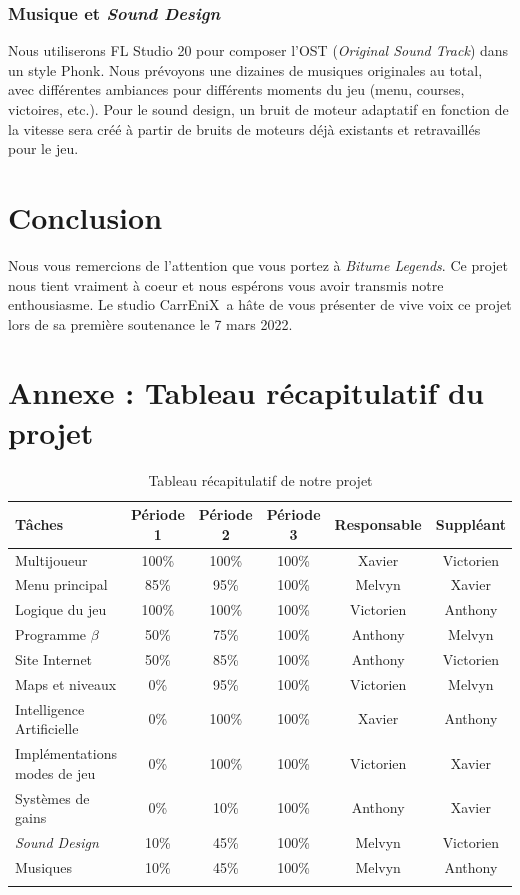 \documentclass[12pt,a4paper]{article}
\newcommand{\btmlgs}{\textit{Bitume Legends}}
\newcommand{\AI}{Intelligence Artificielle}
\newcommand{\CEX}{CarrEniX}
\begin{document}
\subsubsection{Musique et \textit{Sound Design}}
Nous utiliserons FL Studio 20 pour composer l'OST (\textit{Original Sound Track}) dans un style Phonk.
Nous prévoyons une dizaines de musiques originales au total, avec différentes ambiances pour
différents moments du jeu (menu, courses, victoires, etc.). Pour le sound design, un bruit de 
moteur adaptatif en fonction de la vitesse sera créé à partir de bruits de moteurs déjà 
existants et retravaillés pour le jeu.
\clearpage

\section{Conclusion}
Nous vous remercions de l'attention que vous portez à \btmlgs.
Ce projet nous tient vraiment à coeur et nous espérons vous avoir transmis notre enthousiasme.
Le studio \CEX\, a hâte de vous présenter de vive voix ce projet lors de sa première soutenance le 7 mars 2022.


\section{Annexe : Tableau récapitulatif du projet}
\renewcommand{\arraystretch}{1.2}
\setlength{\LTleft}{-1cm plus 1 fill}
\setlength{\LTright}{-1cm plus 1 fill}
\begin{longtable}{| p{4.5cm} || c | c | c | c | c |}
    \hline
    Tâches & Période 1 & Période 2 & Période 3 & Responsable & Suppléant\\\hline\hline
    Multijoueur & 100\% & 100\% & 100\% & Xavier & Victorien \\\hline
    Menu principal & 85\% & 95\% & 100\% & Melvyn & Xavier \\\hline
    Logique du jeu & 100\% & 100\%  & 100\% & Victorien & Anthony\\\hline
    Programme \(\beta\) & 50\% & 75\% & 100\% & Anthony & Melvyn \\\hline
    Site Internet & 50\% & 85\%  & 100\% & Anthony & Victorien\\\hline
    Maps et niveaux & 0\% & 95\%  & 100\% & Victorien & Melvyn\\\hline
    \AI & 0\% & 100\%  & 100\% & Xavier & Anthony\\\hline
    Implémentations modes de jeu & 0\% & 100\%  & 100\% & Victorien & Xavier\\\hline
    Systèmes de gains & 0\% & 10\%  & 100\% & Anthony & Xavier\\\hline
    \textit{Sound Design} & 10\% & 45\% & 100\% & Melvyn & Victorien\\\hline
    Musiques & 10\% & 45\%  & 100\% & Melvyn & Anthony \\\hline
    \caption{Tableau récapitulatif de notre projet}
\end{longtable}
\end{document}
